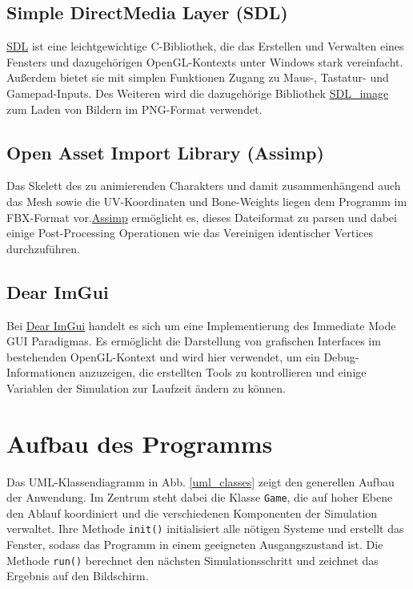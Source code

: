 \subsection{Simple DirectMedia Layer (SDL)}
\href{https://www.libsdl.org/index.php}{SDL} ist eine leichtgewichtige C-Bibliothek, die das Erstellen und Verwalten eines Fensters und dazugehörigen OpenGL-Kontexts unter Windows stark vereinfacht. Außerdem bietet sie mit simplen Funktionen Zugang zu Maus-, Tastatur- und Gamepad-Inputs. Des Weiteren wird die dazugehörige Bibliothek \href{https://www.libsdl.org/projects/SDL_image/}{SDL\_image} zum Laden von Bildern im PNG-Format verwendet.

\subsection{Open Asset Import Library (Assimp)}
Das Skelett des zu animierenden Charakters und damit zusammenhängend auch das Mesh sowie die UV-Koordinaten und Bone-Weights liegen dem Programm im FBX-Format vor.\href{http://assimp.org/}{Assimp} ermöglicht es, dieses Dateiformat zu parsen und dabei einige Post-Processing Operationen wie das Vereinigen identischer Vertices durchzuführen.

\subsection{Dear ImGui}
Bei \href{https://github.com/ocornut/imgui}{Dear ImGui} handelt es sich um eine Implementierung des Immediate Mode GUI Paradigmas. Es ermöglicht die Darstellung von grafischen Interfaces im bestehenden OpenGL-Kontext und wird hier verwendet, um ein Debug-Informationen anzuzeigen, die erstellten Tools zu kontrollieren und einige Variablen der Simulation zur Laufzeit ändern zu können.

\section{Aufbau des Programms}
Das UML-Klassendiagramm in Abb. \ref{uml_classes} zeigt den generellen Aufbau der Anwendung. Im Zentrum steht dabei die Klasse \lstinline{Game}, die auf hoher Ebene den Ablauf koordiniert und die verschiedenen Komponenten der Simulation verwaltet. Ihre Methode \lstinline{init()} initialisiert alle nötigen Systeme und erstellt das Fenster, sodass das Programm in einem geeigneten Ausgangszustand ist. Die Methode \lstinline{run()} berechnet den nächsten Simulationsschritt und zeichnet das Ergebnis auf den Bildschirm.

